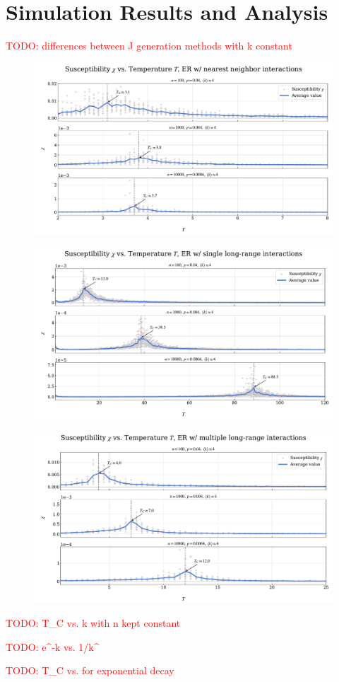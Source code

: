 \documentclass[11pt,a4paper]{article}
\newcommand{\todo}[1]{\textcolor{red}{TODO: #1}}
\begin{document}
\section{Simulation Results and Analysis}

\todo{differences between J generation methods with k constant}

\begin{figure}[ht!]
    \includegraphics[width=\textwidth]{../figures/suscept_ER_nearest.pdf}
\end{figure}

\begin{figure}[ht!]
    \includegraphics[width=\textwidth]{../figures/suscept_ER_single.pdf}
\end{figure}

\begin{figure}[ht!]
    \includegraphics[width=\textwidth]{../figures/suscept_ER_multiple.pdf}
\end{figure}

\todo{T_C vs. k with n kept constant}

\todo{e^{-\alpha k} vs. 1/k^\alpha}

\todo{T_C vs. \alpha for exponential decay}
\end{document}
